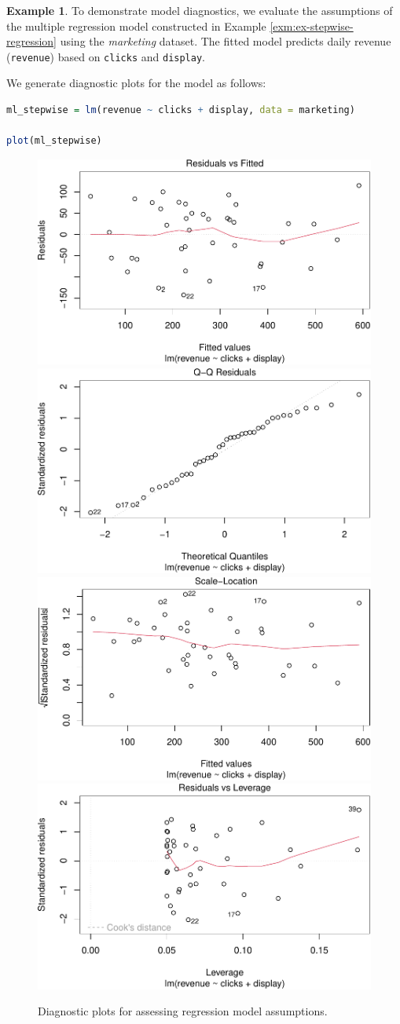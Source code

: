 \documentclass[
]{book}
\newcommand{\passthrough}[1]{#1}
\theoremstyle{definition}
\theoremstyle{definition}
\newtheorem{example}{Example}[chapter]
\theoremstyle{definition}
\theoremstyle{definition}
\theoremstyle{remark}
\begin{document}
\begin{example}
\protect\hypertarget{exm:ex-diagnosing-regression}{}\label{exm:ex-diagnosing-regression}To demonstrate model diagnostics, we evaluate the assumptions of the multiple regression model constructed in Example \ref{exm:ex-stepwise-regression} using the \emph{marketing} dataset. The fitted model predicts daily revenue (\passthrough{\lstinline!revenue!}) based on \passthrough{\lstinline!clicks!} and \passthrough{\lstinline!display!}.

We generate diagnostic plots for the model as follows:

\begin{lstlisting}[language=R]
ml_stepwise = lm(revenue ~ clicks + display, data = marketing)

plot(ml_stepwise)  
\end{lstlisting}

\begin{figure}
\includegraphics[width=0.5\linewidth]{regression_files/figure-latex/model-diagnostics-1} \includegraphics[width=0.5\linewidth]{regression_files/figure-latex/model-diagnostics-2} \includegraphics[width=0.5\linewidth]{regression_files/figure-latex/model-diagnostics-3} \includegraphics[width=0.5\linewidth]{regression_files/figure-latex/model-diagnostics-4} \caption{Diagnostic plots for assessing regression model assumptions.}\label{fig:model-diagnostics}
\end{figure}


\end{example}
\end{document}
